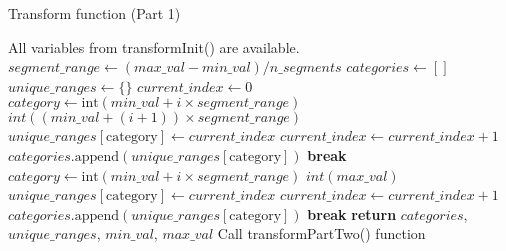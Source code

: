 \documentclass[a4paper, 12pt]{report}
\begin{document}
\begin{algorithm}
    \caption{Transform function (Part 1)}
    \begin{algorithmic}[1]
    \State All variables from transformInit() are available.
            \State $segment\_range \gets (max\_val - min\_val) / n\_segments$
            \State $categories \gets []$
            \State $unique\_ranges \gets \{\}$
            \State $current\_index \gets 0$
                            \State $category \gets \text{{int}}(min\_val + i \times segment\_range)$
                            \State $int((min\_val + (i + 1)) \times segment\_range)$
                                \State $unique\_ranges[\text{category}] \gets current\_index$
                                \State $current\_index \gets current\_index + 1$
                            \EndIf
                            \State $categories.\text{append}(unique\_ranges[\text{category}])$
                            \State \textbf{break}
                        \EndIf
                    \Else
                            \State $category \gets \text{{int}}(min\_val + i \times segment\_range)$
                            \State $int(max\_val)$
                                \State $unique\_ranges[\text{category}] \gets current\_index$
                                \State $current\_index \gets current\_index + 1$
                            \EndIf
                            \State $categories.\text{append}(unique\_ranges[\text{category}])$
                            \State \textbf{break}
                        \EndIf
                    \EndIf
                \EndFor
            \EndFor
            \State \textbf{return} $categories$, $unique\_ranges$, $min\_val$, $max\_val$
        \Else
            \State Call transformPartTwo() function
        \EndIf
    \EndFunction
    \end{algorithmic}
\end{algorithm}
\end{document}
